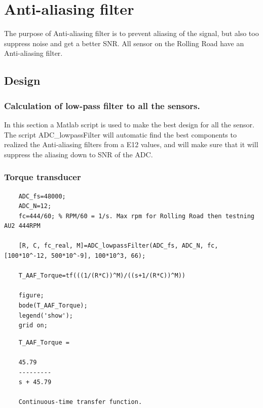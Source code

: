 \section{Anti-aliasing filter}
The purpose of Anti-aliasing filter is to prevent aliasing of the signal, but also too suppress noise and get a better SNR. All sensor on the Rolling Road have an Anti-aliasing filter.  

\subsection{Design}



\sloppy
{}
\setlength{\parindent}{0pt}

%
	
	
	
	\subsubsection{Calculation of low-pass filter to all the sensors.}
	
	In this section a Matlab script is used to make the best design for all the sensor.
	The script ADC\_lowpassFilter will automatic find the best components to realized the Anti-aliasing filters from a E12 values, and will make sure that it will suppress the aliasing down to SNR of the ADC.
	
	
		
	\subsubsection*{Torque transducer}
	
	\begin{lstlisting}
	ADC_fs=48000;
	ADC_N=12;
	fc=444/60; % RPM/60 = 1/s. Max rpm for Rolling Road then testning AU2 444RPM
	
	[R, C, fc_real, M]=ADC_lowpassFilter(ADC_fs, ADC_N, fc, [100*10^-12, 500*10^-9], 100*10^3, 66);
	
	T_AAF_Torque=tf(((1/(R*C))^M)/((s+1/(R*C))^M))
	
	figure;
	bode(T_AAF_Torque);
	legend('show');
	grid on;
	\end{lstlisting}
	
	\color{lightgray} \begin{verbatim}
	T_AAF_Torque =
	
	45.79
	---------
	s + 45.79
	
	Continuous-time transfer function.
	
	\end{verbatim} 
	
